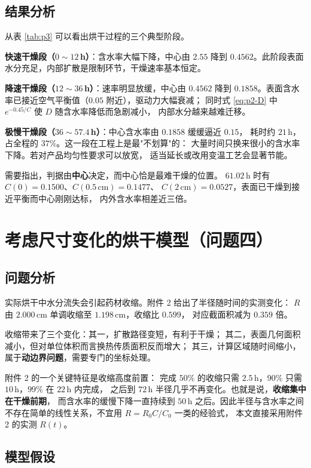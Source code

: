 \documentclass[12pt,a4paper]{ctexart}
\begin{document}
\subsection{结果分析}

从表 \ref{tab:p3} 可以看出烘干过程的三个典型阶段。

\textbf{快速干燥段（$0\sim12$\,h）}：含水率大幅下降，中心由 $2.55$ 降到
$0.4562$。此阶段表面水分充足，内部扩散是限制环节，干燥速率基本恒定。

\textbf{降速干燥段（$12\sim36$\,h）}：速率明显放缓，中心由 $0.4562$ 降到
$0.1858$。表面含水率已接近空气平衡值（$0.05$ 附近），驱动力大幅衰减；
同时式 \eqref{eq:p2-D} 中 $e^{-0.45/C}$ 使 $D$ 随含水率降低而急剧减小，
内部水分越来越难迁移。

\textbf{极慢干燥段（$36\sim57.4$\,h）}：中心含水率由 $0.1858$ 缓缓逼近 $0.15$，
耗时约 $21$\,h，占全程的 $37\%$。这一段在工程上是最"不划算"的：
大量时间只换来很小的含水率下降。若对产品均匀性要求可以放宽，
适当延长或改用变温工艺会显著节能。

需要指出，判据由\textbf{中心}决定，而中心恰是最难干燥的位置。
$61.02$\,h 时有 $C(0)=0.1500$、$C(0.5\,\mathrm{cm})=0.1477$、
$C(2\,\mathrm{cm})=0.0527$，表面已干燥到接近平衡而中心刚刚达标，
内外含水率相差近三倍。

\section{考虑尺寸变化的烘干模型（问题四）}

\subsection{问题分析}

实际烘干中水分流失会引起药材收缩。附件 2 给出了半径随时间的实测变化：
$R$ 由 $2.000$\,cm 单调收缩至 $1.198$\,cm，收缩比 $0.599$，
对应截面积减为 $0.359$ 倍。

收缩带来了三个变化：其一，扩散路径变短，有利于干燥；
其二，表面几何面积减小，但对单位体积而言换热传质面积反而增大；
其三，计算区域随时间缩小，属于\textbf{动边界问题}，需要专门的坐标处理。

附件 2 的一个关键特征是收缩高度前置：
完成 $50\%$ 的收缩只需 $2.5$\,h，$90\%$ 只需 $10$\,h，$99\%$ 在 $22$\,h 内完成，
之后到 $72$\,h 半径几乎不再变化。也就是说，\textbf{收缩集中在干燥前期}，
而含水率的缓慢下降一直持续到 $50$\,h 之后。因此半径与含水率之间
不存在简单的线性关系，不宜用 $R=R_0 C/C_0$ 一类的经验式，
本文直接采用附件 2 的实测 $R(t)$。

\subsection{模型假设}
\end{document}
